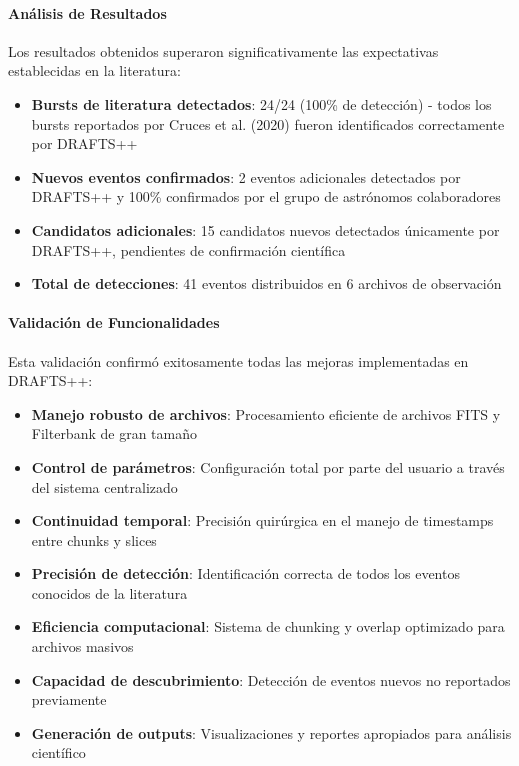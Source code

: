 \paragraph{Análisis de Resultados}

Los resultados obtenidos superaron significativamente las expectativas establecidas en la literatura:

\begin{itemize}
    \item \textbf{Bursts de literatura detectados}: 24/24 (100\% de detección) - todos los bursts reportados por Cruces et al. (2020) fueron identificados correctamente por DRAFTS++
    \item \textbf{Nuevos eventos confirmados}: 2 eventos adicionales detectados por DRAFTS++ y 100\% confirmados por el grupo de astrónomos colaboradores
    \item \textbf{Candidatos adicionales}: 15 candidatos nuevos detectados únicamente por DRAFTS++, pendientes de confirmación científica
    \item \textbf{Total de detecciones}: 41 eventos distribuidos en 6 archivos de observación
\end{itemize}

\paragraph{Validación de Funcionalidades}

Esta validación confirmó exitosamente todas las mejoras implementadas en DRAFTS++:

\begin{itemize}
    \item \textbf{Manejo robusto de archivos}: Procesamiento eficiente de archivos FITS y Filterbank de gran tamaño
    \item \textbf{Control de parámetros}: Configuración total por parte del usuario a través del sistema centralizado
    \item \textbf{Continuidad temporal}: Precisión quirúrgica en el manejo de timestamps entre chunks y slices
    \item \textbf{Precisión de detección}: Identificación correcta de todos los eventos conocidos de la literatura
    \item \textbf{Eficiencia computacional}: Sistema de chunking y overlap optimizado para archivos masivos
    \item \textbf{Capacidad de descubrimiento}: Detección de eventos nuevos no reportados previamente
    \item \textbf{Generación de outputs}: Visualizaciones y reportes apropiados para análisis científico
\end{itemize}

